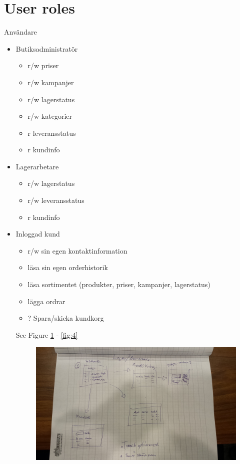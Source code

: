 \documentclass[paper=a4, fontsize=11pt]{report} %
\begin{document}
\section*{User roles}
Användare
\begin{itemize}
	\item Butiksadministratör
		\begin{itemize}
			\item r/w priser
			\item r/w kampanjer
			\item r/w lagerstatus
			\item r/w kategorier
			\item r leveransstatus
			\item r kundinfo
		\end{itemize}
	\item Lagerarbetare
		\begin{itemize}
			\item r/w lagerstatus
			\item r/w leveransstatus
			\item r kundinfo
		\end{itemize}
	\item Inloggad kund
		\begin{itemize}
			\item r/w sin egen kontaktinformation
			\item läsa sin egen orderhistorik
			\item läsa sortimentet (produkter, priser, kampanjer, lagerstatus)
			\item lägga ordrar
			\item ? Spara/skicka kundkorg
		\end{itemize}

		See Figure \ref{fig:2} - \ref{fig:4}

	\begin{figure}
		\includegraphics[scale=0.12]{artifacts/Lager.jpeg}
		\caption{}
		\label{fig:2}
	\end{figure}


\end{itemize}
\end{document}
